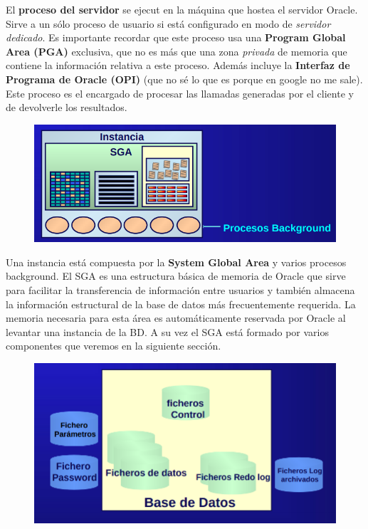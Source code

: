 El \textbf{proceso del servidor} se ejecut en la máquina que hostea el servidor Oracle. Sirve a un sólo proceso de usuario si está configurado en modo de \textit{servidor dedicado}. Es importante recordar que este proceso usa una \textbf{Program Global Area (PGA)} exclusiva, que no es más que una zona \textit{privada} de memoria que contiene la información relativa a este proceso. Además incluye la \textbf{Interfaz de Programa de Oracle (OPI)} (que no sé lo que es porque en google no me sale). Este proceso es el encargado de procesar las llamadas generadas por el cliente y de devolverle los resultados.

\begin{figure}[H]
  \center
  \includegraphics[scale=0.3]{img/p1.png}
\end{figure}

Una instancia está compuesta por la \textbf{System Global Area} y varios procesos background. El SGA es una estructura básica de memoria de Oracle que sirve para facilitar la transferencia de información entre usuarios y también almacena la información estructural de la base de datos más frecuentemente requerida. La memoria necesaria para esta área es automáticamente reservada por Oracle al levantar una instancia de la BD. A su vez el SGA está formado por varios componentes que veremos en la siguiente sección.

\begin{figure}[H]
  \center
  \includegraphics[scale=0.3]{img/p2.png}
\end{figure}

